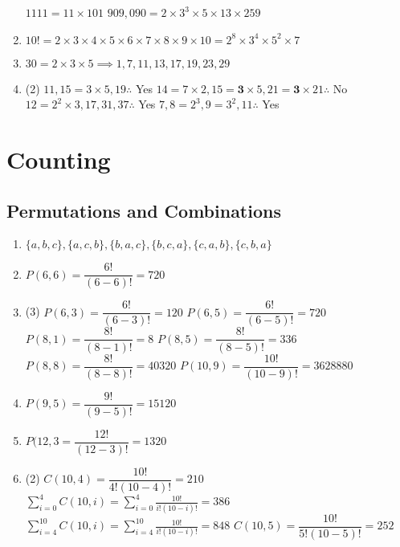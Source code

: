 \documentclass[12pt, A4]{article}
\begin{document}
\begin{enumerate}
\begin{tasks}
							\task
								\(1111 = 11 \times 101\)
							\task
								\(909,090 = 2 \times 3^3 \times 5 \times 13 \times 259\)
						\end{tasks}
					\setcounter{enumi}{4}
					\item
						\(10! = 2 \times 3 \times 4 \times 5 \times 6 \times 7 \times 8 \times 9 \times 10 = 2^8 \times 3^4 \times 5^2 \times 7\)
					\setcounter{enumi}{14}
					\item
						\(30 = 2 \times 3 \times 5 \implies 1, 7, 11, 13, 17, 19, 23, 29\)
					\setcounter{enumi}{16}
					\item
						\begin{tasks}(2)
							\task
								\(11, 15 = 3 \times 5, 19 \therefore\) Yes
							\task
								\(14 = 7 \times 2, 15 = \bm{3} \times 5, 21 = \bm{3} \times 21 \therefore\) No
							\task
								\(12 = 2^2 \times 3, 17, 31, 37 \therefore\) Yes
							\task
								\(7, 8 = 2^3, 9 = 3^2, 11 \therefore\) Yes
						\end{tasks}
				\end{enumerate}
	\setcounter{section}{5}
	\section{Counting}
		\setcounter{subsection}{2}
		\subsection{Permutations and Combinations}
			\begin{enumerate}
				\item
					\(\{a, b, c\}, \{a, c, b\}, \{b, a, c\}, \{b, c, a\}, \{c, a, b\}, \{c, b, a\}\)
				\setcounter{enumi}{2}
				\item
					\(P(6, 6) = \dfrac{6!}{(6 - 6)!} = 720\)
				\setcounter{enumi}{4}
				\item
					\begin{tasks}(3)
						\task
							\(P(6, 3) = \dfrac{6!}{(6 - 3)!} = 120\)
						\task
							\(P(6, 5) = \dfrac{6!}{(6 - 5)!} = 720\)
						\task
							\(P(8, 1) = \dfrac{8!}{(8 - 1)!} = 8\)
						\task
							\(P(8, 5) = \dfrac{8!}{(8 - 5)!} = 336\)
						\task
							\(P(8, 8) = \dfrac{8!}{(8 - 8)!} = 40320\)
						\task
							\(P(10, 9) = \dfrac{10!}{(10 - 9)!} = 3628880\) 
					\end{tasks}
				\setcounter{enumi}{6}
				\item
					\(P(9, 5) = \dfrac{9!}{(9 - 5)!} = 15120\)
				\setcounter{enumi}{8}
				\item
					\(P(12, 3 = \dfrac{12!}{(12 - 3)!} = 1320\)
				\setcounter{enumi}{10}
				\item
					\begin{tasks}(2)
						\task
							\(C(10, 4) = \dfrac{10!}{4!(10 - 4)!} = 210\)
						\task
							\(\displaystyle \sum_{i = 0}^4 C(10, i) = \sum_{i = 0}^4 \frac{10!}{i!(10 - i)!} = 386\)
						\task
							\(\displaystyle \sum_{i = 4}^{10} C(10, i) = \sum_{i = 4}^{10} \frac{10!}{i!(10 - i)!} = 848\)
						\task
							\(C(10, 5) = \dfrac{10!}{5!(10 - 5)!} = 252\)
					\end{tasks}
			\end{enumerate}
\end{document}
